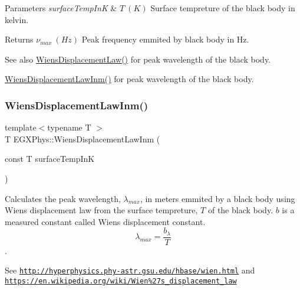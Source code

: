 \begin{DoxyParams}{Parameters}
{\em surface\+Temp\+InK} & $T\ (K)$ Surface tempreture of the black body in kelvin. \\
\hline
\end{DoxyParams}
\begin{DoxyReturn}{Returns}
$\nu_{max}\ (Hz)$ Peak frequency emmited by black body in Hz. 
\end{DoxyReturn}
\begin{DoxySeeAlso}{See also}
\mbox{\hyperlink{group___e_g_x_phys-_electrodynamics-_black_body-_wiens_displacement_law_ga8f89ce1baac45a1717f604255d04af44}{Wiens\+Displacement\+Law()}} for peak wavelength of the black body. 

\mbox{\hyperlink{group___e_g_x_phys-_electrodynamics-_black_body-_wiens_displacement_law_ga126ebb146c31a2371f1d1d001d11c62f}{Wiens\+Displacement\+Law\+Inm()}} for peak wavelength of the black body. 
\end{DoxySeeAlso}
\mbox{\label{group___e_g_x_phys-_electrodynamics-_black_body-_wiens_displacement_law_ga126ebb146c31a2371f1d1d001d11c62f}} 
\subsubsection{\texorpdfstring{Wiens\+Displacement\+Law\+Inm()}{WiensDisplacementLawInm()}}
{\footnotesize\ttfamily template$<$typename T $>$ \\
T E\+G\+X\+Phys\+::\+Wiens\+Displacement\+Law\+Inm (\begin{DoxyParamCaption}\item[{const T}]{surface\+Temp\+InK }\end{DoxyParamCaption})}



Calculates the peak wavelength, $\lambda_{max}$, in meters emmited by a black body using Wien\textquotesingle{}s displacement law from the surface tempreture, $T$ of the black body. $b$ is a measured constant called Wien\textquotesingle{}s displacement constant. \[\lambda_{max} = \dfrac{b_\lambda}{T} \]. 

See \href{http://hyperphysics.phy-astr.gsu.edu/hbase/wien.html}{\tt http\+://hyperphysics.\+phy-\/astr.\+gsu.\+edu/hbase/wien.\+html} and \href{https://en.wikipedia.org/wiki/Wien%27s_displacement_law}{\tt https\+://en.\+wikipedia.\+org/wiki/\+Wien\%27s\+\_\+displacement\+\_\+law}


